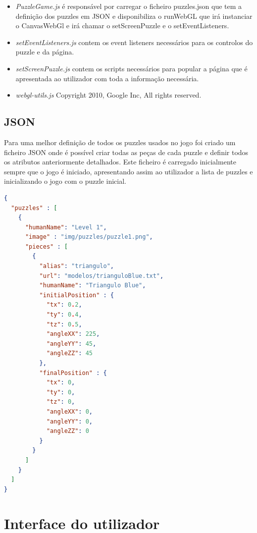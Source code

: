 \documentclass[pdftex,12pt,a4paper]{report}
\begin{document}
\begin{itemize}
        \item \textit{PuzzleGame.js} é responsável por carregar o ficheiro puzzles.json que tem a definição dos puzzles em JSON e disponibiliza o runWebGL que irá instanciar o CanvasWebGl e irá chamar o setScreenPuzzle e o setEventListeners.
	\item \textit{setEventListeners.js} contem os event listeners necessários para os controlos do puzzle e da página.
	\item \textit{setScreenPuzzle.js} contem os scripts necessários para popular a página que é apresentada ao utilizador com toda a informação necessária.
	\item \textit{webgl-utils.js} Copyright 2010, Google Inc, All rights reserved.
	                    
\end{itemize}

\subsection{JSON}

Para uma melhor definição de todos os puzzles usados no jogo foi criado um ficheiro JSON onde é possível criar todas as peças de cada puzzle e definir todos os atributos anteriormente detalhados. Este ficheiro é carregado inicialmente sempre que o jogo é iniciado, apresentando assim ao utilizador a lista de puzzles e inicializando o jogo com o puzzle inicial.

\begin{lstlisting}[language=json,firstnumber=1]
{
  "puzzles" : [
    {
      "humanName": "Level 1",
      "image" : "img/puzzles/puzzle1.png",
      "pieces" : [
        {
          "alias": "triangulo",
          "url": "modelos/trianguloBlue.txt",
          "humanName": "Triangulo Blue",
          "initialPosition" : {
            "tx": 0.2,
            "ty": 0.4,
            "tz": 0.5,
            "angleXX": 225,
            "angleYY": 45,
            "angleZZ": 45
          },
          "finalPosition" : {
            "tx": 0,
            "ty": 0,
            "tz": 0,
            "angleXX": 0,
            "angleYY": 0,
            "angleZZ": 0
          }
        }
      ]
    }
  ]
}
\end{lstlisting}

\newpage

\section{Interface do utilizador}
\end{document}
